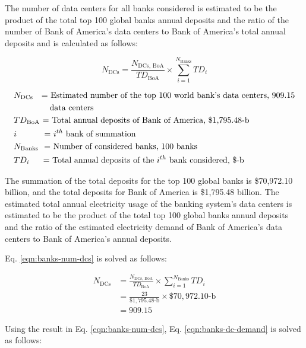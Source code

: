 The number of data centers for all banks considered is estimated to be the product of the total top 100 global banks annual deposits and the ratio of the number of Bank of America’s data centers to Bank of America’s total annual deposits and is calculated as follows:

\begin{equation}\label{eqn:banks-num-dcs}
  N_\textrm{DCs} = \frac{N_\textrm{DCs, BoA}} {TD_\textrm{BoA}} \times \sum \limits_{i=1} ^ {N_\textrm{Banks}} TD_i 
\end{equation}

\begin{align*}
  &N_\textrm{DCs}  \textrm{ \ \ = Estimated number of the top 100 world bank's data centers, 909.15} \\
  &\textrm{\qquad \qquad \ data centers} \\
  &TD_\textrm{BoA} \textrm{ = Total annual deposits of Bank of America, \$1,795.48-b} \\
  &i \textrm{ \qquad \ \ \ = $i^{th}$ bank of summation} \\
  &N_\textrm{Banks} \textrm{ \ = Number of considered banks, 100 banks} \\
  &TD_i  \textrm{ \quad \ = Total annual deposits of the $i^{th}$ bank considered, \$-b}
\end{align*}

The summation of the total deposits for the top 100 global banks is \$70,972.10 billion, and the total deposits for Bank of America is \$1,795.48 billion.
The estimated total annual electricity usage of the banking system’s data centers is estimated to be the product of the total top 100 global banks annual deposits and the ratio of the estimated electricity demand of Bank of America’s data centers to Bank of America’s annual deposits.

Eq. \eqref{eqn:banks-num-dcs} is solved as follows:

\begin{align}\label{eqn:banks-num-dcs}
  N_\textrm{DCs} &= \frac{N_\textrm{DCs, BoA}} {TD_\textrm{BoA}} \times \sum \limits_{i=1} ^ {N_\textrm{Banks}} TD_i \nonumber \\
                 &= \frac{23} {\$1,795.48\textrm{-b}} \times \$70,972.10\textrm{-b} \nonumber \\
                 &= 909.15 
\end{align}

Using the result in Eq. \eqref{eqn:banks-num-dcs}, Eq. \eqref{eqn:banks-dc-demand} is solved as follows:

